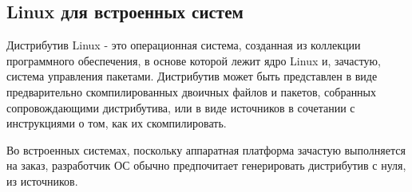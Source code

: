 \subsection{Linux для встроенных систем}
\label{subsec:linux-for-embedded-systems}


Дистрибутив Linux - это операционная система, созданная из коллекции программного обеспечения, в основе которой лежит ядро Linux и, зачастую, система управления пакетами. Дистрибутив может быть представлен в виде предварительно скомпилированных двоичных файлов и пакетов, собранных сопровождающими дистрибутива, или в виде источников в сочетании с инструкциями о том, как их скомпилировать.

Во встроенных системах, поскольку аппаратная платформа зачастую выполняется на заказ, разработчик ОС обычно предпочитает генерировать дистрибутив с нуля, из источников.

